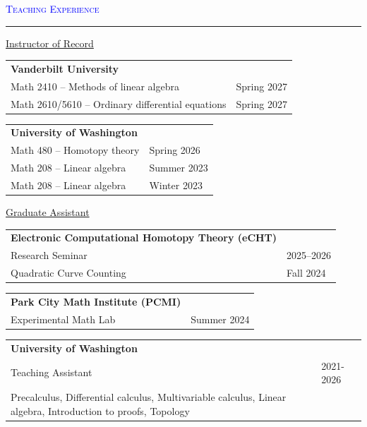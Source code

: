 \documentclass[10pt]{article}
\makeatletter
\newcommand{\grey}[1]{\textcolor{cvgrey}{#1}}
\newcommand{\myarray}[1]{
    \begin{tabular}{>{\raggedright\arraybackslash}p{11.5cm} >{\raggedleft\arraybackslash}p{5.33cm}}
    #1
    \end{tabular}
}
\newcommand{\altarray}[1]{
    \begin{tabular}{>{\raggedright\arraybackslash}p{13cm} @{\hskip 1cm} >{\raggedleft\arraybackslash}p{3.25cm}}
    #1
    \end{tabular}
}
\newenvironment{rSection}[1]{ %
  \medskip
  {\large\scshape\textcolor{Blue}{#1}} %
  \smallskip
  \hrule %
  \begin{list}{}{ %
    \setlength{\leftmargin}{0em} %
  }
  \item[]
}{
  \end{list}
}
\makeatother
\begin{document}
\begin{rSection}{Teaching Experience}

\underline{Instructor of Record}

\myarray{
    \textbf{Vanderbilt University} \\
    Math 2410 -- Methods of linear algebra & \footnotesize \grey{Spring 2027}\\
    Math 2610/5610 -- Ordinary differential equations & \footnotesize \grey{Spring 2027}
}

\myarray{
    \textbf{University of Washington}  \\%
    Math 480 -- Homotopy theory & \footnotesize \grey{Spring 2026} \\
    Math 208 -- Linear algebra & \footnotesize \grey{Summer 2023}\\
    Math 208 -- Linear algebra & \footnotesize \grey{Winter 2023} \\
}

\underline{Graduate Assistant}

\altarray{
   \textbf{Electronic Computational Homotopy Theory (eCHT)}\\
   Research Seminar & \footnotesize \grey{2025--2026} \\
    Quadratic Curve Counting  & \footnotesize \grey{Fall 2024}
}

\altarray{ 
    \textbf{Park City Math Institute (PCMI)} \\
    Experimental Math Lab & \footnotesize \grey{Summer 2024}
}

\altarray{
    \textbf{University of Washington} \\
    Teaching Assistant & \footnotesize \grey{2021-2026}\\
    \grey{Precalculus, Differential calculus, Multivariable calculus, Linear algebra, Introduction to proofs, Topology}
}



\end{rSection}
\end{document}
